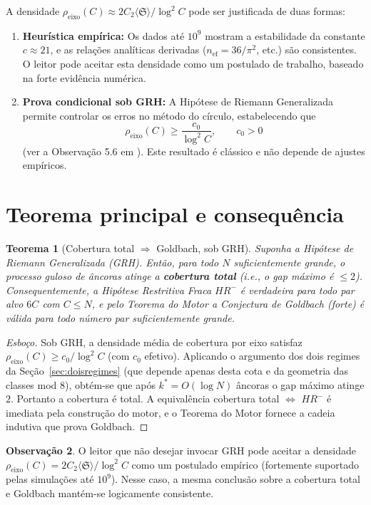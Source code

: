 \documentclass[11pt]{article}
\newtheorem{theorem}{Teorema}
\theoremstyle{definition}
\newtheorem{remark}[theorem]{Observação}
\begin{document}
	A densidade $\rho_{\text{eixo}}(C) \approx 2C_2\langle\mathfrak{S}\rangle/\log^2 C$ pode ser justificada de duas formas:
	
	\begin{enumerate}
		\item \textbf{Heurística empírica:} Os dados até $10^9$ mostram a estabilidade da constante $c\approx21$, e as relações analíticas derivadas ($n_{\text{ef}}=36/\pi^2$, etc.) são consistentes. O leitor pode aceitar esta densidade como um postulado de trabalho, baseado na forte evidência numérica.
		\item \textbf{Prova condicional sob GRH:} A Hipótese de Riemann Generalizada permite controlar os erros no método do círculo, estabelecendo que
		\[
		\rho_{\text{eixo}}(C) \ge \frac{c_0}{\log^2 C},\qquad c_0>0
		\]
		(ver a Observação 5.6 em \cite{art6}). Este resultado é clássico e não depende de ajustes empíricos.
	\end{enumerate}
	
	\section{Teorema principal e consequência}
	
	\begin{theorem}[Cobertura total $\Rightarrow$ Goldbach, sob GRH]
		Suponha a Hipótese de Riemann Generalizada (GRH). Então, para todo $N$ suficientemente grande, o processo guloso de âncoras atinge a \textbf{cobertura total} (i.e., o gap máximo é $\le2$). Consequentemente, a Hipótese Restritiva Fraca $HR^-$ é verdadeira para todo par alvo $6C$ com $C\le N$, e pelo Teorema do Motor \cite{art7} a Conjectura de Goldbach (forte) é válida para todo número par suficientemente grande.
	\end{theorem}
	
	\begin{proof}[Esboço]
		Sob GRH, a densidade média de cobertura por eixo satisfaz $\rho_{\text{eixo}}(C) \ge c_0/\log^2 C$ (com $c_0$ efetivo). Aplicando o argumento dos dois regimes da Seção~\ref{sec:doisregimes} (que depende apenas desta cota e da geometria das classes mod 8), obtém-se que após $k^* = O(\log N)$ âncoras o gap máximo atinge $2$. Portanto a cobertura é total. A equivalência cobertura total $\Leftrightarrow$ $HR^-$ é imediata pela construção do motor, e o Teorema do Motor \cite{art7} fornece a cadeia indutiva que prova Goldbach.
	\end{proof}
	
	\begin{remark}
		O leitor que não desejar invocar GRH pode aceitar a densidade $\rho_{\text{eixo}}(C) = 2C_2\langle\mathfrak{S}\rangle/\log^2 C$ como um postulado empírico (fortemente suportado pelas simulações até $10^9$). Nesse caso, a mesma conclusão sobre a cobertura total e Goldbach mantém-se logicamente consistente.
	\end{remark}
	
\end{document}
